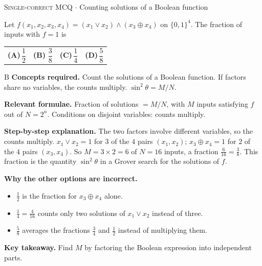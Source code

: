 \documentclass[11pt,a4paper]{article}
\newcommand{\optlabel}[1]{\textbf{(#1)}}
\newcommand{\correctlabel}[1]{\textcolor{okgreen}{\textbf{(#1)}\,\ding{51}}}
\newenvironment{qitem}[1]{\begin{list}{}{\setlength{\leftmargin}{3.3em}\setlength{\labelwidth}{3.1em}%
  \setlength{\labelsep}{0.2em}\setlength{\topsep}{3pt}\setlength{\parsep}{3pt}}\item[\textbf{Q.#1}\hfill]}{\end{list}}
\newcommand{\qsep}{\par\vspace{2pt}{\color{black!15}\hrule}\vspace{4pt}}
\newcommand{\qmeta}[2]{{\footnotesize\color{black!60}\textsc{#1} \;$\cdot$\; #2}\par}
\begin{document}
\begin{qitem}{10}
\qmeta{Single-correct MCQ}{Counting solutions of a Boolean function}
Let $f(x_1, x_2, x_3, x_4) = (x_1 \lor x_2) \land (x_3 \oplus x_4)$ on $\{0, 1\}^4$. The fraction of inputs with $f = 1$ is
\par\smallskip\noindent\begin{tabularx}{\linewidth}{@{}*{4}{L}@{}}
\optlabel{A}\,$\dfrac12$ & \correctlabel{B}\,$\dfrac38$ & \optlabel{C}\,$\dfrac14$ & \optlabel{D}\,$\dfrac58$
\end{tabularx}
\end{qitem}
\begin{solbox}{B}
\textbf{\color{brand}Concepts required.} Count the solutions of a Boolean function. If factors share no variables, the counts multiply. $\sin^2\theta = M/N$.

\textbf{\color{brand}Relevant formulae.} Fraction of solutions $= M/N$, with $M$ inputs satisfying $f$ out of $N = 2^n$. Conditions on disjoint variables: counts multiply.

\textbf{\color{brand}Step-by-step explanation.} The two factors involve different variables, so the counts multiply. $x_1 \lor x_2 = 1$ for $3$ of the $4$ pairs $(x_1, x_2)$;
$x_3 \oplus x_4 = 1$ for $2$ of the $4$ pairs $(x_3, x_4)$. So $M = 3\times2 = 6$ of $N = 16$ inputs, a fraction $\frac{6}{16} = \frac38$.
This fraction is the quantity $\sin^2\theta$ in a Grover search for the solutions of $f$.

\textbf{\color{brand}Why the other options are incorrect.}
\begin{itemize}[leftmargin=2.4em, itemsep=1pt, topsep=2pt]
\item[\textbf{(A)}] $\frac12$ is the fraction for $x_3 \oplus x_4$ alone.
\item[\textbf{(C)}] $\frac14 = \frac{4}{16}$ counts only two solutions of $x_1 \lor x_2$ instead of three.
\item[\textbf{(D)}] $\frac58$ averages the fractions $\frac34$ and $\frac12$ instead of multiplying them.
\end{itemize}
\textbf{\color{brand}Key takeaway.} Find $M$ by factoring the Boolean expression into independent parts.
\end{solbox}
\qsep
\end{document}
